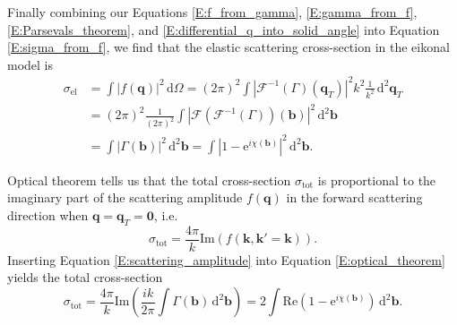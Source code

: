 \documentclass[a4paper, twoside, english, 12pt]{report}
\begin{document}
Finally combining our Equations \eqref{E:f_from_gamma}, \eqref{E:gamma_from_f}, \eqref{E:Parsevals_theorem}, and \eqref{E:differential_q_into_solid_angle} into Equation \eqref{E:sigma_from_f}, we find that the elastic scattering cross-section in the eikonal model is
\begin{align}\label{E:sigma_el_from_profile}
	\sigma_{\text{el}} &= \int \left|f(\mathbf{q})\right|^2 \, \text{d}\Omega = (2\pi)^2 \int \left|\mathcal{F}^{-1}(\Gamma)(\mathbf{q}_T)\right|^2 k^2\frac{1}{k^2}\, \text{d}^2\mathbf{q}_T \nonumber \\
	&= (2\pi)^2 \frac{1}{(2\pi)^2} \int \left|\mathcal{F}\left(\mathcal{F}^{-1}(\Gamma)\right)(\mathbf{b})\right|^2 \, \text{d}^2\mathbf{b}  \nonumber \\
	&= \int \left|\Gamma(\mathbf{b}) \right|^2 \, \text{d}^2\mathbf{b} = \int \left|1-\text{e}^{i\chi(\mathbf{b})} \right|^2 \, \text{d}^2\mathbf{b}.
\end{align}

Optical theorem tells us that \cite[ch. 11]{griff} the total cross-section $\sigma_\text{tot}$ is proportional to the imaginary part of the scattering amplitude $f(\mathbf{q})$ in the forward scattering direction when $\mathbf{q}=\mathbf{q}_T=\mathbf{0}$, i.e.
\begin{equation}\label{E:optical_theorem}
	\sigma_\text{tot} = \frac{4\pi}{k} \text{Im}\left(f(\mathbf{k}, \mathbf{k}' = \mathbf{k})\right).
\end{equation}
Inserting Equation \eqref{E:scattering_amplitude} into Equation \eqref{E:optical_theorem} yields the total cross-section
\begin{equation}\label{E:sigma_tot_from_profile}
\sigma_\text{tot} = \frac{4\pi}{k} \text{Im}\left(\frac{ik}{2\pi}\int \Gamma(\mathbf{b}) \,\text{d}^2\mathbf{b}\right) = 2\int \text{Re}\left(1 - \text{e}^{i\chi(\mathbf{b})}\right) \,\text{d}^2\mathbf{b}.
\end{equation}
\end{document}

